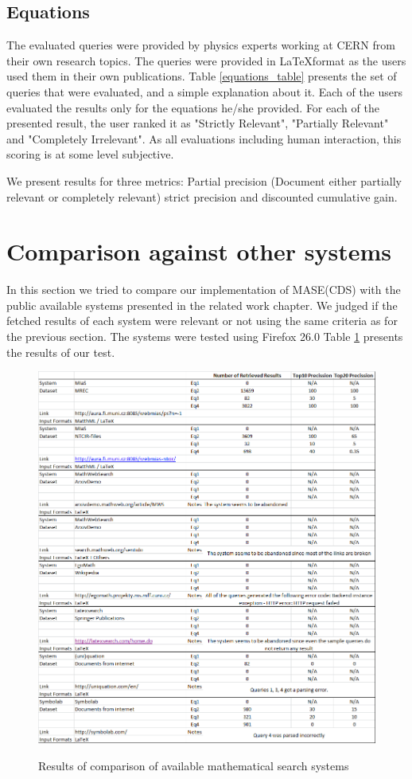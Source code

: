 \subsection{Equations}
The evaluated queries were provided by physics experts working at CERN from their own research topics. The queries were provided in \LaTeX format as the users used them in their own publications.
Table \ref{equations_table} presents the set of queries that were evaluated, and a simple explanation about it. 
Each of the users evaluated the results only for the equations he/she provided. For each of the presented result, the user ranked it as "Strictly Relevant", "Partially Relevant" and "Completely Irrelevant". As all evaluations including human interaction, this scoring is at some level subjective. 

We present results for three metrics: Partial precision (Document either partially relevant or completely relevant) strict precision and discounted cumulative gain.




\section{Comparison against other systems}
In this section we tried to compare our implementation of MASE(CDS) with the public available systems presented in the related work chapter. We judged if the fetched results of each system were relevant or not using the same criteria as for the previous section.  The systems were tested using Firefox 26.0
Table \ref{comparison_sw_table} presents the results of our test.

\begin{figure}
\includegraphics[height=15 cm]{figures/comparison_table.png}
\label{comparison_sw_table}
\caption{Results of comparison of available mathematical search systems}
\end{figure}


